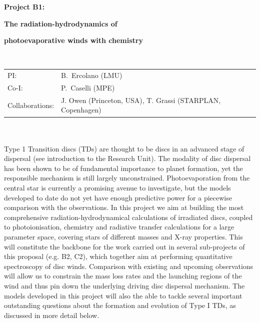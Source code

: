 \documentclass[10pt,fleqn,twoside]{article}
\begin{document}
\newpage


\setcounter{page}{1}

\centerline{\huge\bf\Tcol
%
%
%
%
%
 Project B1:}
\vspace{1em}

\centerline{\LARGE\bf\Tcol The radiation-hydrodynamics of}\vspace{0.3em}
\centerline{\LARGE\bf\Tcol photoevaporative winds with chemistry}

%
%
%
%
%
\vskip1.0cm

\\
\begin{tabular}{ll}
{\textsf{PI:}}                  & B.~Ercolano (LMU)\\
{\textsf{Co-I:}}                &P.~Caselli (MPE)\\
{\textsf{Collaborations:}}      & J. Owen (Princeton, USA), T. Grassi (STARPLAN, Copenhagen)  \
\end{tabular}


\vspace{1em}
 \\

\vspace{1em}
\\
Type 1 Transition discs (TDs) are thought to be discs in an advanced stage of dispersal
(see introduction to the Research Unit). The
modality of disc dispersal has been shown to be of fundamental importance to planet
formation, yet the responsible mechanism is still largely
unconstrained. Photoevaporation from the central star is currently a
promising avenue to investigate, but the models developed to date do
not yet have enough predictive power for a piecewise comparison with
the observations. In this project we aim at building the most
comprehensive radiation-hydrodynamical calculations of irradiated discs, 
coupled to photoionisation, chemistry and radiative transfer
calculations for a large parameter space, covering stars of different
masses and X-ray properties. This will constitute the backbone for the work carried
out in several sub-projects of this proposal (e.g. B2, C2), which together
aim at performing quantitative
spectroscopy of disc winds. Comparison with existing and upcoming
observations will allow us to constrain the mass loss rates and the
launching regions of the wind and thus pin down the underlying driving disc
dispersal mechanism. 
The models developed in this project will also the able to tackle
several important outstanding questions about the formation and evolution of
Type I TDs, as discussed in more detail below. 
\end{document}
